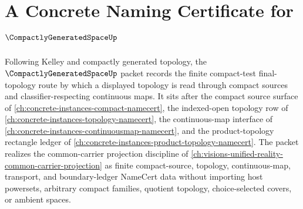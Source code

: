 \chapter{A Concrete Naming Certificate for $\CompactlyGeneratedSpaceUp$}
\label{ch:concrete-instances-compactly-generated-space-namecert}

Following Kelley and compactly generated topology, the $\CompactlyGeneratedSpaceUp$ packet records the finite compact-test final-topology route by which a displayed topology is read through compact sources and classifier-respecting continuous maps. It sits after the compact source surface of \autoref{ch:concrete-instances-compact-namecert}, the indexed-open topology row of \autoref{ch:concrete-instances-topology-namecert}, the continuous-map interface of \autoref{ch:concrete-instances-continuousmap-namecert}, and the product-topology rectangle ledger of \autoref{ch:concrete-instances-product-topology-namecert}. The packet realizes the common-carrier projection discipline of \autoref{ch:visions-unified-reality-common-carrier-projection} as finite compact-source, topology, continuous-map, transport, and boundary-ledger NameCert data without importing host powersets, arbitrary compact families, quotient topology, choice-selected covers, or ambient spaces.

